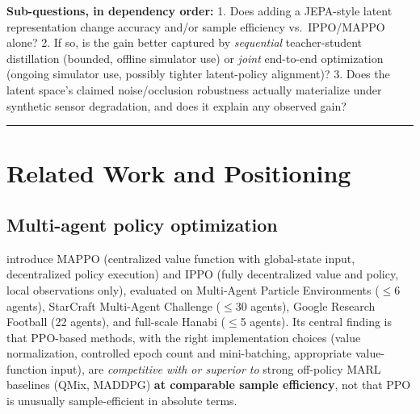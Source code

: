 \documentclass[11pt]{article}
\begin{document}
\textbf{Sub-questions, in dependency order:}
1. Does adding a JEPA-style latent representation change accuracy and/or sample efficiency vs.~IPPO/MAPPO alone?
2. If so, is the gain better captured by \emph{sequential} teacher-student distillation (bounded, offline simulator use) or \emph{joint} end-to-end optimization (ongoing simulator use, possibly tighter latent-policy alignment)?
3. Does the latent space's claimed noise/occlusion robustness actually materialize under synthetic sensor degradation, and does it explain any observed gain?

\begin{center}\rule{0.5\linewidth}{0.5pt}\end{center}

\hypertarget{related-work-and-positioning}{%
\section{Related Work and Positioning}\label{related-work-and-positioning}}

\hypertarget{multi-agent-policy-optimization}{%
\subsection{Multi-agent policy optimization}\label{multi-agent-policy-optimization}}

\citet{yu2021mappo} introduce MAPPO (centralized value function with global-state input, decentralized policy execution) and IPPO (fully decentralized value and policy, local observations only), evaluated on Multi-Agent Particle Environments ($\leq$6 agents), StarCraft Multi-Agent Challenge ($\leq$30 agents), Google Research Football (22 agents), and full-scale Hanabi ($\leq$5 agents). Its central finding is that PPO-based methods, with the right implementation choices (value normalization, controlled epoch count and mini-batching, appropriate value-function input), are \emph{competitive with or superior to} strong off-policy MARL baselines (QMix, MADDPG) \textbf{at comparable sample efficiency}, not that PPO is unusually sample-efficient in absolute terms.
\end{document}
